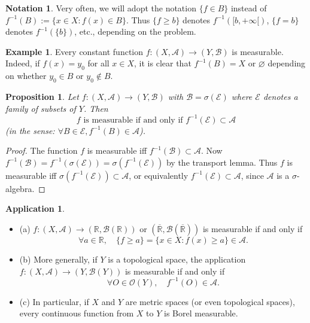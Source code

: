 \documentclass[12pt]{article}
\newtheorem{proposition}{Proposition}[section]
\theoremstyle{definition}
\newtheorem{example}{Example}[section]
\newtheorem{application}{Application}[section]
\newtheorem{notation}{Notation}[section]
\begin{document}
\begin{notation}
	Very often, we will adopt the notation $\{f\in B\}$ instead of $f^{-1}(B):=\{x\in X: f(x)\in B\}$. Thus $\{f\geq b\}$ denotes $f^{-1}([b,+\infty[)$, $\{f=b\}$ denotes $f^{-1}(\{b\})$, etc., depending on the problem.
\end{notation}

\begin{example}
	Every constant function $f:(X,\mathscr{A})\to (Y,\mathscr{B})$ is measurable. Indeed, if $f(x)=y_0$ for all $x\in X$, it is clear that $f^{-1}(B)=X$ or $\varnothing$ depending on whether $y_0\in B$ or $y_0\notin B$.
\end{example}

\begin{proposition}
Let $f:(X,\mathscr{A})\to (Y,\mathscr{B})$ with $\mathscr{B}=\sigma(\mathscr{E})$ where $\mathscr{E}$ denotes a family of subsets of $Y$. Then
\[
f \text{ is measurable if and only if } f^{-1}(\mathscr{E})\subset \mathscr{A}
\]
(in the sense: $\forall B\in \mathscr{E}, f^{-1}(B)\in\mathscr{A}$).
\end{proposition}

\begin{proof}
The function $f$ is measurable iff $f^{-1}(\mathscr{B})\subset \mathscr{A}$. Now $f^{-1}(\mathscr{B})=f^{-1}(\sigma(\mathscr{E}))=\sigma(f^{-1}(\mathscr{E}))$ by the transport lemma. Thus $f$ is measurable iff $\sigma(f^{-1}(\mathscr{E}))\subset \mathscr{A}$, or equivalently $f^{-1}(\mathscr{E})\subset \mathscr{A}$, since $\mathscr{A}$ is a $\sigma$-algebra.
\end{proof}

\begin{application}
\begin{itemize}
\item (a) $f:(X,\mathscr{A})\to (\mathbb{R},\mathscr{B}(\mathbb{R}))$ or $(\overline{\mathbb{R}},\mathscr{B}(\overline{\mathbb{R}}))$ is measurable if and only if
\[
\forall a\in \mathbb{R}, \quad \{f\geq a\}=\{x\in X: f(x)\geq a\}\in\mathscr{A}.
\]

\item (b) More generally, if $Y$ is a topological space, the application $f:(X,\mathscr{A})\to (Y,\mathscr{B}(Y))$ is measurable if and only if
\[
\forall O\in \mathscr{O}(Y), \quad f^{-1}(O)\in \mathscr{A}.
\]

\item (c) In particular, if $X$ and $Y$ are metric spaces (or even topological spaces), every continuous function from $X$ to $Y$ is Borel measurable.
\end{itemize}
\end{application}
\end{document}
